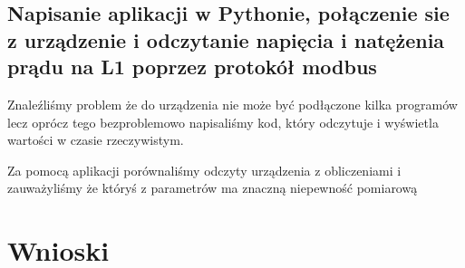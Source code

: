 \documentclass[a4paper,12pt]{extarticle}  %
\begin{document}
\subsection{Napisanie aplikacji w Pythonie, połączenie sie z urządzenie i odczytanie napięcia i natężenia prądu na L1 poprzez protokół modbus}
Znaleźliśmy problem że do urządzenia nie może być podłączone kilka programów lecz oprócz tego bezproblemowo napisaliśmy kod, który odczytuje i wyświetla wartości w czasie rzeczywistym.
% 
\begin{figure}[H]
   \centering
\end{figure}
Za pomocą aplikacji porównaliśmy odczyty urządzenia z obliczeniami i zauważyliśmy że któryś z parametrów ma znaczną niepewność pomiarową
\cleardoublepage
\section{Wnioski}
\end{document}
